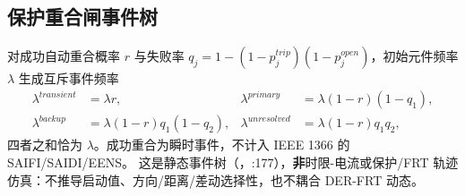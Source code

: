 \subsection{保护重合闸事件树}
对成功自动重合概率 $r$ 与失败率 $q_j=1-(1-p_j^{trip})(1-p_j^{open})$，初始元件频率
$\lambda$ 生成互斥事件频率
\begin{equation}
\begin{aligned}
\lambda^{transient}&=\lambda r, & \lambda^{primary}&=\lambda(1-r)(1-q_1),\\
\lambda^{backup}&=\lambda(1-r)q_1(1-q_2), & \lambda^{unresolved}&=\lambda(1-r)q_1q_2,
\end{aligned}
\end{equation}
四者之和恰为 $\lambda$。成功重合为瞬时事件，不计入 IEEE 1366 的 SAIFI/SAIDI/EENS。
这是静态事件树（，:177），\textbf{非}时限-电流或保护/FRT
轨迹仿真：不推导启动值、方向/距离/差动选择性，也不耦合 DER-FRT 动态。
